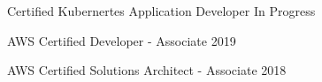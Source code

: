 

\begin{cventries}

  \cventry
    {Certified Kubernertes Application Developer} %
    {} %
    {} %
    {In Progress} %
    {
      \begin{cvitems} %
      \end{cvitems}
    }

  \cventry
    {AWS Certified Developer - Associate} %
    {} %
    {} %
    {2019} %
    {
      \begin{cvitems} %
      \end{cvitems}
    }

  \cventry
    {AWS Certified Solutions Architect - Associate} %
    {} %
    {} %
    {2018} %
    {
      \begin{cvitems} %
      \end{cvitems}
    }

\end{cventries}
